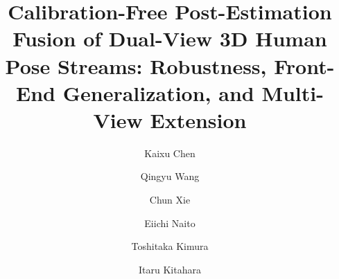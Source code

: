 \documentclass[preprint,12pt]{elsarticle}
\begin{document}
\begin{frontmatter}

\title{Calibration-Free Post-Estimation Fusion of Dual-View 3D Human Pose Streams: Robustness, Front-End Generalization, and Multi-View Extension}

\author[ccs]{Kaixu Chen}
\author[imiss]{Qingyu Wang}
\author[ccs]{Chun Xie}
\author[nict]{Eiichi Naito}
\author[ntt]{Toshitaka Kimura}
\author[ccs]{Itaru Kitahara}

\address[ccs]{Center for Computational Sciences, University of Tsukuba, 1-1-1 Tennodai, Tsukuba, Ibaraki 305-8577, Japan}
\address[imiss]{Degree Programs in Systems and Information Engineering, Graduate School of Science and Technology, University of Tsukuba, 1-1-1 Tennodai, Tsukuba, Ibaraki 305-8573, Japan}
\address[nict]{Center for Information and Neural Networks (CiNet), Advanced ICT Research Institute, National Institute of Information and Communications Technology, 1-4 Yamadaoka, Suita, Osaka 565-0871, Japan}
\address[ntt]{NTT Communication Science Laboratories, NTT, Inc., 3-1 Morinosato-Wakamiya, Atsugi, Kanagawa 243-0198, Japan}


\end{frontmatter}
\end{document}
